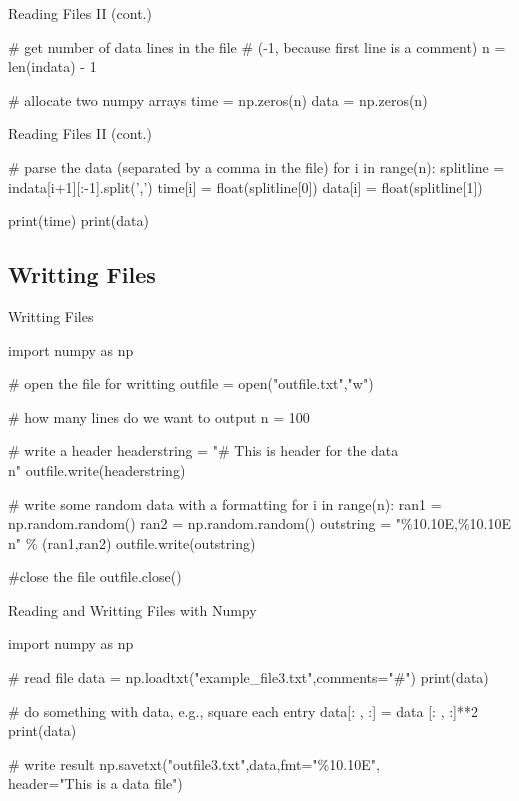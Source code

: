\documentclass[11pt]{beamer}
\begin{document}
\begin{frame}[fragile]{Reading Files II (cont.)}
\begin{semiverbatim}
# get number of data lines in the file 
# (-1, because first line is a comment) 
n = len(indata) - 1

# allocate two numpy arrays 
time = np.zeros(n)
data = np.zeros(n)
\end{semiverbatim}
\end{frame}

\begin{frame}[fragile]{Reading Files II (cont.)}
\begin{semiverbatim}
# parse the data (separated by a comma in the file)
for i in range(n):
    splitline = indata[i+1][:-1].split(',')
    time[i] = float(splitline[0])
    data[i] = float(splitline[1])

print(time)
print(data)
\end{semiverbatim}
\end{frame}

\subsection{Writting Files}
\begin{frame}[fragile]{Writting Files}
\tiny
\begin{semiverbatim}
import numpy as np

# open the file for writting
outfile = open("outfile.txt","w")

# how many lines do we want to output 
n = 100

# write a header
headerstring = "# This is header for the data\\n" 
outfile.write(headerstring)

# write some random data with a formatting
for i in range(n):
    ran1 = np.random.random()
    ran2 = np.random.random()
    outstring = "\%10.10E,\%10.10E\\n" \% (ran1,ran2) 
    outfile.write(outstring)

#close the file
outfile.close()
\end{semiverbatim}
\end{frame}

\begin{frame}[fragile]{Reading and Writting Files with Numpy}
\small
\begin{semiverbatim}
import numpy as np

# read file
data = np.loadtxt("example_file3.txt",comments="#")
print(data)

# do something with data, e.g., square each entry 
data[: , :] = data [: , :]**2
print(data)

# write result 
np.savetxt("outfile3.txt",data,fmt="\%10.10E",\\
    header="This is a data file")
\end{semiverbatim}
\end{frame}
\end{document}
